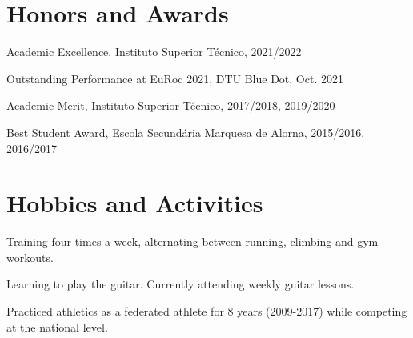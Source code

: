 \documentclass[a4paper,12pt]{article}
\begin{document}
\section{Honors and Awards}

\begin{description}[font=$\circ$]
\itemsep-2pt 
\item {Academic Excellence, Instituto Superior Técnico, 2021/2022}
\item {Outstanding Performance at EuRoc 2021, DTU Blue Dot, Oct. 2021}
\item {Academic Merit, Instituto Superior Técnico, 2017/2018, 2019/2020}
\item {Best Student Award, Escola Secundária Marquesa de Alorna, 2015/2016, 2016/2017}
\end{description}



\section{Hobbies and Activities}

\begin{description}[font=$\circ$]
\itemsep-2pt
\item {Training four times a week, alternating between running, climbing and gym workouts.}
\item {Learning to play the guitar. Currently attending weekly guitar lessons.}
\item {Practiced athletics as a federated athlete for 8 years (2009-2017) while competing at the national level.}
\end{description}



%
\end{document}

